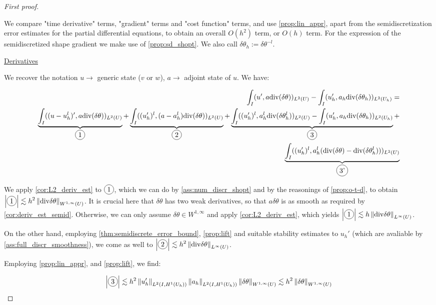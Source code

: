 \documentclass[english,a4paper,9pt,oneside]{scrbook}	%
\theoremstyle{break}
\newenvironment{mproof}[1][\proofname]{%
  \begin{proof}[#1]$ $\par\nobreak\ignorespaces
}{%
  \end{proof}
}
\renewcommand*{\proofname}{Proof}
\theoremstyle{remark}
\newcommand{\ds}{\displaystyle}
\newcommand{\norm}[1]{\left\lVert#1\right\rVert}
\newcommand{\te}{\theta}
\newcommand{\dive}{\text{div}}
\newcommand*\circled[1]{\tikz[baseline=(char.base)]{
            \node[shape=circle,draw,inner sep=2pt] (char) {#1};}}
\begin{document}
\begin{mproof}[First proof]
We compare "time derivative" terms, "gradient" terms and "cost function" terms, and use \cref{prop:lin_appr}, apart from the semidiscretization error estimates for the partial differential equations, to obtain an overall $O(h^2)$ term, or $O(h)$ term. For the expression of the semidiscretized shape gradient we make use of \cref{prop:sd_shopt}. We also call $\delta \te_h := \delta \te^{-l}$.

\underline{Derivatives}

We recover the notation $u\rightarrow$ generic state ($v$ or $w$), $a\rightarrow$ adjoint state of $u$.
We have:

\begin{align*}
	\int_I(u',a\dive(\delta \te))_{L^2(U)}-\int_I (u_h',a_h\dive(\delta \te_h))_{L^2(U_h)}=\\
	\underbrace{\int_I((u-u_h^l)',a\dive(\delta \te))_{L^2(U)}}_{\circled{1}}+
	\underbrace{\int_I((u_h')^l, (a-a_h^l)\dive(\delta \te))_{L^2(U)}}_{\circled{2}}+
	\underbrace{\int_I((u_h')^l, a_h^l\dive(\delta \te_h^l))_{L^2(U)}-\int_I (u_h',a_h\dive(\delta \te_h))_{L^2(U_h)}}_{\circled{3}}+\\
	\underbrace{\int_I((u_h')^l, a_h^l(\dive(\delta \te) - \dive(\delta \te_h^l)))_{L^2(U)}}_{\circled{3'}}
\end{align*}

We apply \cref{cor:L2_deriv_est} to $\circled{1}$, which we can do by \cref{ass:num_discr_shopt} and by the reasonings of \cref{prop:o-t-d}, to obtain $\ds  \left | \circled{1} \right | \lesssim h^2\norm{\dive{\delta \theta}}_{W^{1,\infty}(U)}$.
It is crucial here that $\delta \te$ has two weak derivatives, so that $a\delta \te$ is as smooth as required by \cref{cor:deriv_est_semid}. Otherwise, we can only assume $\delta \te \in W^{1,\infty}$ and apply \cref{cor:L2_deriv_est}, which yields $\ds  \left | \circled{1} \right | \lesssim h\norm{\dive{\delta \theta}}_{L^\infty(U)}$.

On the other hand, employing \cref{thm:semidiscrete_error_bound}, \cref{prop:lift} and suitable stability estimates to $u_h'$ (which are avaliable by \cref{ass:full_discr_smoothness}), we come as well to $\ds \left | \circled{2} \right | \lesssim h^2\norm{\dive{\delta \theta}}_{L^\infty(U)}$.

Employing \cref{prop:lin_appr}, and \cref{prop:lift}, we find:

\begin{align*}
	\left | \circled{3} \right |\lesssim  h^2 \norm{u_h'}_{L^2(I,H^1(U_h))}\norm{a_h}_{L^2(I,H^1(U_h))}\norm{\delta \te}_{W^{1,\infty}(U)} \lesssim  h^2 \norm{\delta \te}_{W^{1,\infty}(U)}
\end{align*}


\end{mproof}
\end{document}
